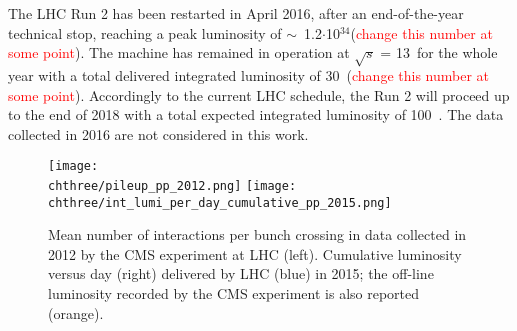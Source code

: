 The LHC Run 2 has been restarted in April 2016, after an end-of-the-year technical stop, reaching a peak luminosity of $\sim$~1.2$\cdot$10$^{34}$\percms (\textcolor{red}{change this number at some point}). The machine has remained in operation at $\sqrt{s}$ = 13~\TeV for the whole year with a total delivered integrated luminosity of 30~\fbinv (\textcolor{red}{change this number at some point}). Accordingly to the current LHC schedule, the Run 2 will proceed up to the end of 2018 with a total expected integrated luminosity of 100~\fbinv. The data collected in 2016 are not considered in this work.



\begin{figure}[h]
 \begin{center}
   \texttt{[image: \\chthree/pileup\_pp\_2012.png]}
  \texttt{[image: \\chthree/int\_lumi\_per\_day\_cumulative\_pp\_2015.png]}
 \end{center}
 \caption{Mean number of interactions per bunch crossing in data collected in 2012 by the CMS experiment at LHC (left). Cumulative luminosity versus day (right) delivered by LHC (blue) in 2015; the off-line luminosity recorded by the CMS experiment is also reported (orange).~\cite{LumiPublicResults}}
 \label{fig:LHClumiAndPU}
\end{figure}

